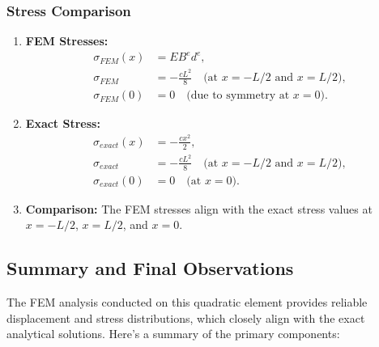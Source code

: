 \subsubsection*{Stress Comparison}

\begin{enumerate}
    \item \textbf{FEM Stresses:}
        \begin{align*}
            \sigma_{FEM}(x) &= E B^e d^e, \\
            \sigma_{FEM} &= -\frac{c L^2}{8} \quad \text{(at } x = -L/2 \text{ and } x = L/2\text{)}, \\
            \sigma_{FEM}(0) &= 0 \quad \text{(due to symmetry at } x = 0\text{)}.
        \end{align*}

    \item \textbf{Exact Stress:}
        \begin{align*}
            \sigma_{exact}(x) &= -\frac{c x^2}{2}, \\
            \sigma_{exact} &= -\frac{c L^2}{8} \quad \text{(at } x = -L/2 \text{ and } x = L/2\text{)}, \\
            \sigma_{exact}(0) &= 0 \quad \text{(at } x = 0\text{)}.
        \end{align*}

    \item \textbf{Comparison:} The FEM stresses align with the exact stress values at \( x = -L/2 \), \( x = L/2 \), and \( x = 0 \).
\end{enumerate}

\subsection*{Summary and Final Observations}

The FEM analysis conducted on this quadratic element provides reliable displacement and stress distributions, which closely align with the exact analytical solutions. Here’s a summary of the primary components:

